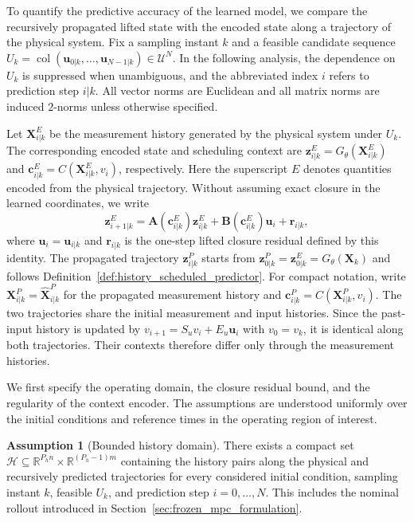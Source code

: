 \documentclass[journal]{IEEEtran}
\newcommand{\vr}{\mathbf{r}}
\newcommand{\vu}{\mathbf{u}}
\newcommand{\vz}{\mathbf{z}}
\newcommand{\vc}{\mathbf{c}}
\newcommand{\mA}{\mathbf{A}}
\newcommand{\mB}{\mathbf{B}}
\newcommand{\mX}{\mathbf{X}}
\newcommand{\R}{\mathbb{R}}
\newcommand{\col}{\operatorname{col}}
\theoremstyle{plain}
\theoremstyle{definition}
\newtheorem{assumption}{Assumption}
\theoremstyle{definition}
\begin{document}
To quantify the predictive accuracy of the learned model, we compare
the recursively propagated lifted state with the encoded state along
a trajectory of the physical system. Fix a sampling instant $k$ and a
feasible candidate sequence $U_k=\col(\vu_{0|k},\ldots,\vu_{N-1|k})
\in\mathcal U^N$. In the following analysis, the dependence on $U_k$
is suppressed when unambiguous, and the abbreviated index $i$ refers
to prediction step $i|k$. All vector norms are Euclidean and all matrix
norms are induced $2$-norms unless otherwise specified.

Let $\mX_{i|k}^E$ be the measurement history generated by the physical
system under $U_k$. The corresponding encoded state and scheduling
context are $\vz_{i|k}^E=G_\theta(\mX_{i|k}^E)$ and
$\vc_{i|k}^E=C(\mX_{i|k}^E,v_i)$, respectively. Here the superscript
$E$ denotes quantities encoded from the physical trajectory. Without
assuming exact closure in the learned coordinates, we write
\begin{equation}
\vz_{i+1|k}^E=\mA(\vc_{i|k}^E)\vz_{i|k}^E
+\mB(\vc_{i|k}^E)\vu_i+\vr_{i|k},
\label{eq:encoded_residual_identity}
\end{equation}
where $\vu_i=\vu_{i|k}$ and $\vr_{i|k}$ is the one-step lifted
closure residual defined by this identity. The propagated trajectory
$\vz_{i|k}^P$ starts from $\vz_{0|k}^P=\vz_{0|k}^E=G_\theta(\mX_k)$
and follows Definition~\ref{def:history_scheduled_predictor}.
For compact notation, write $\mX_{i|k}^P=\widehat{\mX}_{i|k}^P$ for the
propagated measurement history and $\vc_{i|k}^P=C(\mX_{i|k}^P,v_i)$.
The two trajectories share the initial measurement and input histories.
Since the past-input history is updated by $v_{i+1}=S_uv_i+E_u\vu_i$
with $v_0=v_k$, it is identical along both trajectories. Their contexts
therefore differ only through the measurement histories.

We first specify the operating domain, the closure residual bound, and
the regularity of the context encoder. The assumptions are understood
uniformly over the initial conditions and reference times in the
operating region of interest.

\begin{assumption}[Bounded history domain]
\label{asm:domain}
There exists a compact set $\mathcal H\subseteq
\R^{P_hn}\times\R^{(P_h-1)m}$ containing the history pairs along the
physical and recursively predicted trajectories for every considered
initial condition, sampling instant $k$, feasible $U_k$, and prediction
step $i=0,\ldots,N$. This includes the nominal rollout introduced in
Section~\ref{sec:frozen_mpc_formulation}.
\end{assumption}
\end{document}
